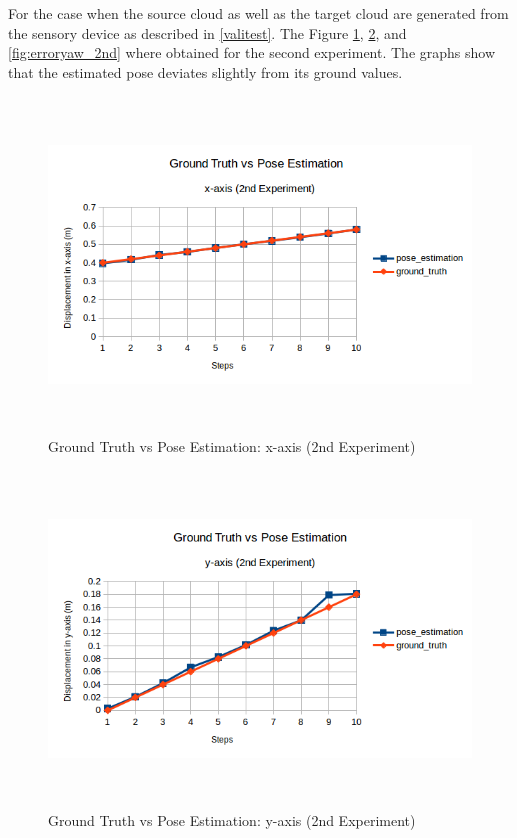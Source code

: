 For the case when the source cloud as well as the target cloud are generated from the sensory device as described in \ref{valitest}. The Figure \ref{fig:errorx_2nd}, \ref{fig:errory_2nd}, and \ref{fig:erroryaw_2nd} where obtained for the second experiment. The graphs show that the estimated pose deviates slightly from its ground values.
\begin{figure}[!h]
\begin{center}
\includegraphics[width=5in, height=3.5in]{figures05/2_x_validation.png}
\caption{Ground Truth vs Pose Estimation: x-axis (2nd Experiment)}
\label{fig:errorx_2nd}
\end{center}
\end{figure}
\begin{figure}[!h]
\begin{center}
\includegraphics[width=5in, height=3.5in]{figures05/2_y_validation.png}
\caption{Ground Truth vs Pose Estimation: y-axis (2nd Experiment)}
\label{fig:errory_2nd}
\end{center}
\end{figure}
